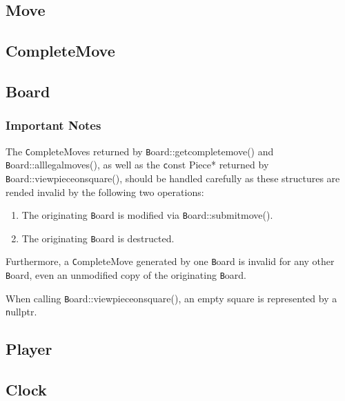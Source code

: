 \documentclass[letter]{article}
\newcommand{\code}[1]{{\texttt #1}}
\renewcommand\_{\textunderscore\allowbreak}
\begin{document}
\subsection{Move}

\subsection{Complete\_Move}

\subsection{Board}
\subsubsection*{Important Notes}
The \code{Complete\_Move}s returned by \code{Board::get\_complete\_move()} and \code{Board::all\_legal\_moves()}, as well as the \code{const Piece*} returned by \code{Board::view\_piece\_on\_square()}, should be handled carefully as these structures are rended invalid by the following two operations:
\begin{enumerate}
	\item The originating \code{Board} is modified via \code{Board::submit\_move()}.
	\item The originating \code{Board} is destructed.
\end{enumerate}
Furthermore, a \code{Complete\_Move} generated by one \code{Board} is invalid for any other \code{Board}, even an unmodified copy of the originating \code{Board}.

When calling \code{Board::view\_piece\_on\_square()}, an empty square is represented by a \code{nullptr}.

\subsection{Player}

\subsection{Clock}
\end{document}
